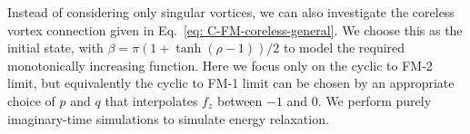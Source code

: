 Instead of considering only singular vortices, we can also investigate the
coreless vortex connection given in Eq.~\eqref{eq: C-FM-coreless-general}.
We choose this as the initial state, with
\(\beta = \pi\left(1 + \tanh(\rho-1)\right)/2\) to model the required
monotonically increasing function.
Here we focus only on the cyclic to FM-2 limit, but equivalently the cyclic to
FM-1 limit can be chosen by an appropriate choice of \(p\) and \(q\) that
interpolates \(f_z\) between \(-1\) and \(0\).
We perform purely imaginary-time simulations to simulate energy relaxation.
\begin{figure}
    \centering
\end{figure}
